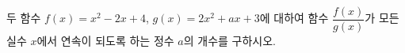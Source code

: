 두 함수 $f(x)=x^2-2x+4$, $g(x)=2x^2+ax+3$에 대하여 함수 $\dfrac{f(x)}{g(x)}$가 모든 실수 $x$에서 연속이 되도록 하는 정수 $a$의 개수를 구하시오.
